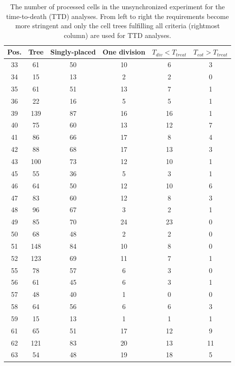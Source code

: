 \documentclass[pdftex,12pt,a4paper]{report}
\begin{document}
\begin{appendices}
\begin{table}[h]
\centering
\begin{tabular}{c | c | c | c | c | c}
\hline
Pos. & Tree & Singly-placed & One division & $T_{div} < T_{treat}$ & $T_{eot} > T_{treat}$
\\
\hline\hline
33 & 61 & 50 & 10 & 6 & 3
\\
34 & 15 & 13 & 2 & 2 & 0
\\
35 & 61 & 51 & 13 & 7 & 1
\\
36 & 22 & 16 & 5 & 5 & 1
\\
39 & 139 & 87 & 16 & 16 & 1
\\
40 & 75 & 60 & 13 & 12 & 7
\\
41 & 86 & 66 & 17 & 8 & 4
\\
42 & 88 & 68 & 17 & 13 & 3
\\
43 & 100 & 73 & 12 & 10 & 1
\\
45 & 55 & 36 & 5 & 3 & 1
\\
46 & 64 & 50 & 12 & 10 & 6
\\
47 & 83 & 60 & 12 & 8 & 3
\\
48 & 96 & 67 & 3 & 2 & 1
\\
49 & 85 & 70 & 24 & 23 & 0
\\
50 & 68 & 48 & 2 & 2 & 0
\\
51 & 148 & 84 & 10 & 8 & 0
\\
52 & 123 & 69 & 11 & 7 & 1
\\
55 & 78 & 57 & 6 & 3 & 0
\\
56 & 61 & 45 & 6 & 3 & 1
\\
57 & 48 & 40 & 1 & 0 & 0
\\
58 & 64 & 56 & 6 & 6 & 3
\\
59 & 15 & 13 & 1 & 1 & 1
\\
61 & 65 & 51 & 17 & 12 & 9
\\
62 & 121 & 83 & 20 & 13 & 11
\\
63 & 54 & 48 & 19 & 18 & 5
\\
\hline
\end{tabular}
\caption[Micro-trench yields statistics for the image positions 33 - 63 in the unsynchronized experiment]{The number of processed cells in the unsynchronized experiment for the time-to-death (TTD) analyses. From left to right the requirements become more stringent and only the cell trees fulfilling all criteria (rightmost column) are used for TTD analyses.}
\end{table}




\end{appendices}
\end{document}
